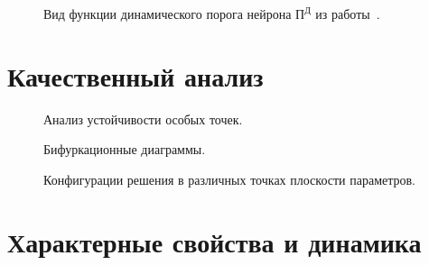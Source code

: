 \begin{figure}[ht]
	\caption{Вид функции динамического порога нейрона $\text{П}^\text{Д}$ из работы~\cite{EmelyanovYaroslavsky1990}. }
	\label{img:model_extern_dynamic_threshold}
\end{figure}

\section{Качественный анализ} \label{section:neuron_equilibrium}



\begin{figure}[ht]
    \caption{Анализ устойчивости особых точек.}
    \label{img:model_sigm_equilibriums}
\end{figure}

\begin{figure}[ht]
    \caption{Бифуркационные диаграммы.}
    \label{img:model_sigm_bifurcations}
\end{figure}

\begin{figure}[ht]
    \caption{Конфигурации решения в различных точках плоскости параметров.}
    \label{img:model_sigm_configurations}
\end{figure}


\section{Характерные свойства и динамика} \label{section:neuron_parameters}


